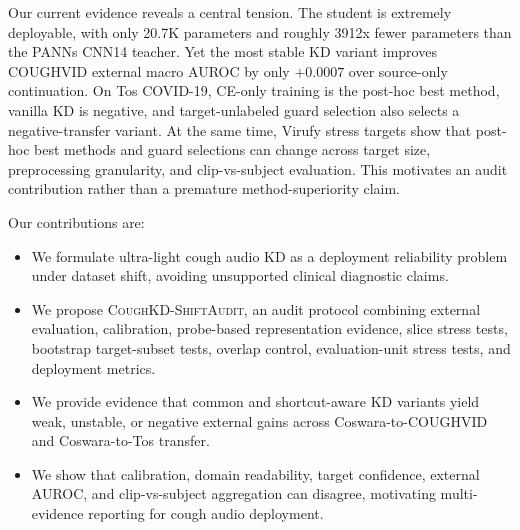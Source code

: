 Our current evidence reveals a central tension. The student is extremely deployable, with only 20.7K parameters and roughly 3912x fewer parameters than the PANNs CNN14 teacher. Yet the most stable KD variant improves COUGHVID external macro AUROC by only $+0.0007$ over source-only continuation. On Tos COVID-19, CE-only training is the post-hoc best method, vanilla KD is negative, and target-unlabeled guard selection also selects a negative-transfer variant. At the same time, Virufy stress targets show that post-hoc best methods and guard selections can change across target size, preprocessing granularity, and clip-vs-subject evaluation. This motivates an audit contribution rather than a premature method-superiority claim.

Our contributions are:
\begin{itemize}
    \item We formulate ultra-light cough audio KD as a deployment reliability problem under dataset shift, avoiding unsupported clinical diagnostic claims.
    \item We propose \textsc{CoughKD-ShiftAudit}, an audit protocol combining external evaluation, calibration, probe-based representation evidence, slice stress tests, bootstrap target-subset tests, overlap control, evaluation-unit stress tests, and deployment metrics.
    \item We provide evidence that common and shortcut-aware KD variants yield weak, unstable, or negative external gains across Coswara-to-COUGHVID and Coswara-to-Tos transfer.
    \item We show that calibration, domain readability, target confidence, external AUROC, and clip-vs-subject aggregation can disagree, motivating multi-evidence reporting for cough audio deployment.
\end{itemize}
